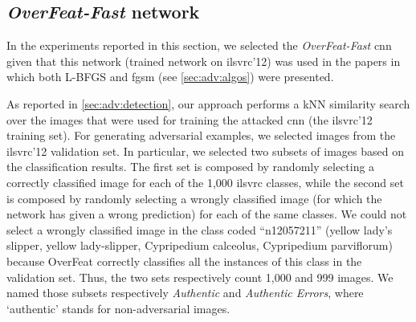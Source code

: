 
\subsection{\emph{OverFeat-Fast} network}
\label{subsec:adv:overfeat}
In the experiments reported in this section, we selected the \emph{OverFeat-Fast} \gls{cnn}~\cite{sermanet2013overfeat} given that this network (trained network on \gls{ilsvrc}'12) was used in the papers in which both L-BFGS and \acrlong{fgsm} (see \ref{sec:adv:algos}) were presented.

As reported in \ref{sec:adv:detection}, our approach performs a kNN similarity search over the images that were used for training the attacked \gls{cnn} (the \gls{ilsvrc}'12 training set).
For generating adversarial examples, we selected images from the \gls{ilsvrc}'12 validation set.
In particular, we selected two subsets of images based on the classification results.
The first set is composed by randomly selecting a correctly classified image for each of the 1,000 \gls{ilsvrc} classes, while the second set is composed by randomly selecting a wrongly classified image (for which the network has given a wrong prediction) for each of the same classes.
We could not select a wrongly classified image in the class coded ``n12057211'' (yellow lady's slipper, yellow lady-slipper, Cypripedium calceolus, Cypripedium parviflorum) because OverFeat correctly classifies all the instances of this class in the validation set.
Thus, the two sets respectively count 1,000 and 999 images.
We named those subsets respectively \emph{Authentic} and \emph{Authentic Errors}, where `authentic' stands for non-adversarial images.

